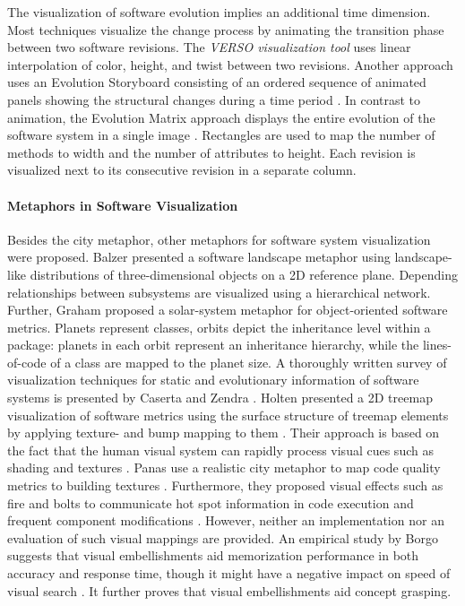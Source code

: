 The visualization of software evolution implies an additional time dimension.
Most techniques visualize the change process by animating the transition phase between two software revisions.
The \emph{VERSO visualization tool} \cite{Langelier2008} uses linear interpolation of color, height, and twist between two revisions. 
Another approach uses an Evolution Storyboard consisting of an ordered sequence of animated panels showing the structural changes during a time period \cite{Beyer2006}.
In contrast to animation, the Evolution Matrix approach displays the entire evolution of the software system in a single image \cite{Lanza2001}. 
Rectangles are used to map the number of methods to width and the number of attributes to height. 
Each revision is visualized next to its consecutive revision in a separate column.

\paragraph*{Metaphors in Software Visualization}

Besides the city metaphor, other metaphors for software system visualization were proposed. 
Balzer \etal presented a software landscape metaphor \cite{Balzer2004} using landscape-like distributions of three-dimensional objects on a 2D reference plane. 
Depending relationships between subsystems are visualized using a hierarchical network. 
Further, Graham \etal proposed a solar-system metaphor \cite{Graham2004} for object-oriented software metrics.
Planets represent classes, orbits depict the inheritance level within a package: planets in each orbit represent an inheritance hierarchy, while the lines-of-code of a class are mapped to the planet size. 
A thoroughly written survey of visualization techniques for static and evolutionary information of software systems is presented by Caserta and Zendra \cite{Caserta2011}.
Holten \etal presented a 2D treemap visualization of software metrics using the surface structure of treemap elements by applying texture- and bump mapping to them \cite{Holten2005}. 
Their approach is based on the fact that the human visual system can rapidly process visual cues such as shading and textures \cite{Enns1990,Healey1998,Healey1999}.
Panas \etal use a realistic city metaphor to map code quality metrics to building textures \cite{Caserta2011}. 
Furthermore, they proposed visual effects such as fire and bolts to communicate hot spot information in code execution and frequent component modifications \cite{Panas2003}.
However, neither an implementation nor an evaluation of such visual mappings are provided.
An empirical study by Borgo \etal suggests that visual embellishments aid memorization performance in both accuracy and response time, though it might have a negative impact on speed of visual search \cite{Borgo2012}.
It further proves that visual embellishments aid concept grasping.

